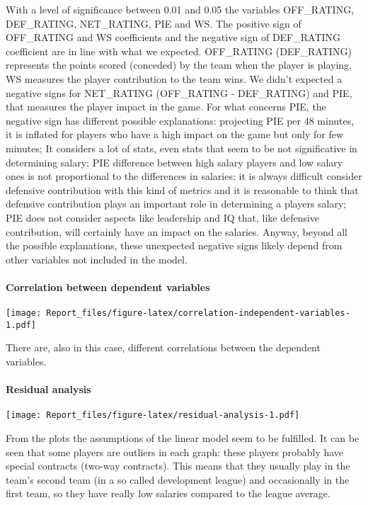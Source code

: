 \documentclass[
]{article}
\begin{document}
With a level of significance between 0.01 and 0.05 the variables
OFF\_RATING, DEF\_RATING, NET\_RATING, PIE and WS. The positive sign of
OFF\_RATING and WS coefficients and the negative sign of DEF\_RATING
coefficient are in line with what we expected. OFF\_RATING (DEF\_RATING)
represents the points scored (conceded) by the team when the player is
playing, WS measures the player contribution to the team wins. We didn't
expected a negative signs for NET\_RATING (OFF\_RATING - DEF\_RATING)
and PIE, that measures the player impact in the game. For what concerns
PIE, the negative sign has different possible explanations: projecting
PIE per 48 minutes, it is inflated for players who have a high impact on
the game but only for few minutes; It considers a lot of stats, even
stats that seem to be not significative in determining salary; PIE
difference between high salary players and low salary ones is not
proportional to the differences in salaries; it is always difficult
consider defensive contribution with this kind of metrics and it is
reasonable to think that defensive contribution plays an important role
in determining a players salary; PIE does not consider aspects like
leadership and IQ that, like defensive contribution, will certainly have
an impact on the salaries. Anyway, beyond all the possible explanations,
these unexpected negative signs likely depend from other variables not
included in the model.

\hypertarget{correlation-between-dependent-variables}{%
\paragraph{Correlation between dependent
variables}\label{correlation-between-dependent-variables}}

\texttt{[image: Report\_files/figure-latex/correlation-independent-variables-1.pdf]}

There are, also in this case, different correlations between the
dependent variables.

\hypertarget{residual-analysis}{%
\paragraph{Residual analysis}\label{residual-analysis}}

\texttt{[image: Report\_files/figure-latex/residual-analysis-1.pdf]}

From the plots the assumptions of the linear model seem to be fulfilled.
It can be seen that some players are outliers in each graph: these
players probably have special contracts (two-way contracts). This means
that they usually play in the team's second team (in a so called
development league) and occasionally in the first team, so they have
really low salaries compared to the league average.
\end{document}
